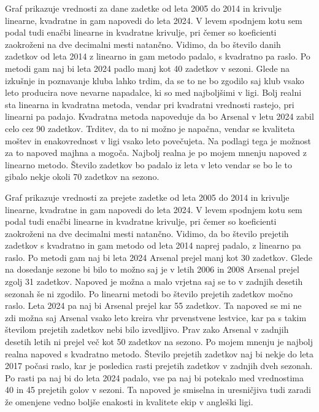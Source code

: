 \documentclass[11pt,a4paper]{article}
\begin{document}
Graf prikazuje vrednosti za dane zadetke od leta 2005 do 2014 in krivulje linearne, kvadratne in gam napovedi do leta 2024. V levem spodnjem kotu sem podal tudi enačbi linearne in kvadratne krivulje, pri čemer so koeficienti zaokroženi na dve decimalni mesti natančno. Vidimo, da bo število danih zadetkov od leta 2014 z linearno in gam metodo padalo, s kvadratno pa raslo. Po metodi gam naj bi leta 2024 padlo manj kot 40 zadetkov v sezoni. Glede na izkušnje in poznavanje kluba lahko trdim, da se to ne bo zgodilo saj klub vsako leto producira nove nevarne napadalce, ki so med najboljšimi v ligi. Bolj realni sta linearna in kvadratna metoda, vendar pri kvadratni vrednosti rastejo, pri linearni pa padajo. Kvadratna metoda napoveduje da bo Arsenal v letu 2024 zabil celo cez 90 zadetkov. Trditev, da to ni možno je napačna, vendar se kvaliteta moštev in enakovrednost v ligi vsako leto povečujeta. Na podlagi tega je možnost za to napoved majhna a mogoča. Najbolj realna je po mojem mnenju napoved z linearno metodo. Število zadetkov bo padalo iz leta v leto vendar se bo le to gibalo nekje okoli 70 zadetkov na sezono. 


Graf prikazuje vrednosti za prejete zadetke od leta 2005 do 2014 in krivulje linearne, kvadratne in gam napovedi do leta 2024. V levem spodnjem kotu sem podal tudi enačbi linearne in kvadratne krivulje, pri čemer so koeficienti zaokroženi na dve decimalni mesti natančno. Vidimo, da bo število prejetih zadetkov s kvadratno in gam metodo od leta 2014 naprej padalo, z linearno pa raslo. Po metodi gam naj bi leta 2024 Arsenal prejel manj kot 30 zadetkov. Glede na dosedanje sezone bi bilo to možno saj je v letih 2006 in 2008 Arsenal prejel zgolj 31 zadetkov. Napoved je možna a malo vrjetna saj se to v zadnjih desetih sezonah še ni zgodilo. Po linearni metodi bo število prejetih zadetkov močno raslo. Leta 2024 pa naj bi Arsenal prejel kar 55 zadetkov. Ta napoved se mi ne zdi možna saj Arsenal vsako leto kreira vhr prvenstvene lestvice, kar pa s takim številom prejetih zadetkov nebi bilo izvedljivo. Prav zako Arsenal v zadnjih desetih letih ni prejel več kot 50 zadetkov na sezono. Po mojem mnenju je najbolj realna napoved s kvadratno metodo. Število prejetih zadetkov naj bi nekje do leta 2017 počasi raslo, kar je posledica rasti prejetih zadetkov v zadnjih dveh sezonah. Po rasti pa naj bi do leta 2024 padalo, vse pa naj bi potekalo med vrednostima 40 in 45 prejetih golov v sezoni. Ta napoved je smiselna in uresničjiva tudi zaradi že omenjene vedno boljše enakosti in  kvalitete ekip v angleški ligi. 
\end{document}
